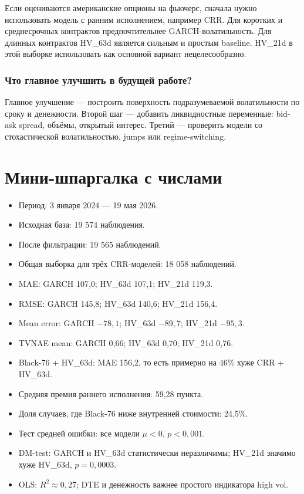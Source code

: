 \documentclass[11pt,a4paper]{article}
\begin{document}
Если оцениваются американские опционы на фьючерс, сначала нужно использовать модель с ранним исполнением, например CRR. Для коротких и среднесрочных контрактов предпочтительнее GARCH-волатильность. Для длинных контрактов HV\_63d является сильным и простым baseline. HV\_21d в этой выборке использовать как основной вариант нецелесообразно.

\subsubsection{Что главное улучшить в будущей работе?}

Главное улучшение --- построить поверхность подразумеваемой волатильности по сроку и денежности. Второй шаг --- добавить ликвидностные переменные: bid-ask spread, объёмы, открытый интерес. Третий --- проверить модели со стохастической волатильностью, jumps или regime-switching.

\section{Мини-шпаргалка с числами}

\begin{itemize}
    \item Период: 3 января 2024 --- 19 мая 2026.
    \item Исходная база: 19 574 наблюдения.
    \item После фильтрации: 19 565 наблюдений.
    \item Общая выборка для трёх CRR-моделей: 18 058 наблюдений.
    \item MAE: GARCH 107,0; HV\_63d 107,1; HV\_21d 119,3.
    \item RMSE: GARCH 145,8; HV\_63d 140,6; HV\_21d 156,4.
    \item Mean error: GARCH $-78{,}1$; HV\_63d $-89{,}7$; HV\_21d $-95{,}3$.
    \item TVNAE mean: GARCH 0,66; HV\_63d 0,70; HV\_21d 0,76.
    \item Black-76 + HV\_63d: MAE 156,2, то есть примерно на 46\% хуже CRR + HV\_63d.
    \item Средняя премия раннего исполнения: 59,28 пункта.
    \item Доля случаев, где Black-76 ниже внутренней стоимости: 24,5\%.
    \item Тест средней ошибки: все модели $\mu<0$, $p<0{,}001$.
    \item DM-test: GARCH и HV\_63d статистически неразличимы; HV\_21d значимо хуже HV\_63d, $p=0{,}0003$.
    \item OLS: $R^2\approx0{,}27$; DTE и денежность важнее простого индикатора high vol.
\end{itemize}
\end{document}
